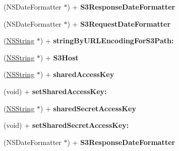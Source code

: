 \begin{DoxyCompactItemize}
\item 
\hypertarget{interface_a_s_i_s3_request_ac0d60115b59954ffcc2e293c60321a74}{
(\-N\-S\-Date\-Formatter $\ast$) + {\bfseries \-S3\-Response\-Date\-Formatter}}
\label{interface_a_s_i_s3_request_ac0d60115b59954ffcc2e293c60321a74}

\item 
\hypertarget{interface_a_s_i_s3_request_ac2da1def71701c5ed345a2e119dad803}{
(\-N\-S\-Date\-Formatter $\ast$) + {\bfseries \-S3\-Request\-Date\-Formatter}}
\label{interface_a_s_i_s3_request_ac2da1def71701c5ed345a2e119dad803}

\item 
\hypertarget{interface_a_s_i_s3_request_aab8bdd9f5d8970a3bcfca36ec9dee9fb}{
(\hyperlink{class_n_s_string}{\-N\-S\-String} $\ast$) + {\bfseries string\-By\-U\-R\-L\-Encoding\-For\-S3\-Path\-:}}
\label{interface_a_s_i_s3_request_aab8bdd9f5d8970a3bcfca36ec9dee9fb}

\item 
\hypertarget{interface_a_s_i_s3_request_ae49e83f64fb2490185d0a9ff3649e1d3}{
(\hyperlink{class_n_s_string}{\-N\-S\-String} $\ast$) + {\bfseries \-S3\-Host}}
\label{interface_a_s_i_s3_request_ae49e83f64fb2490185d0a9ff3649e1d3}

\item 
\hypertarget{interface_a_s_i_s3_request_aadbf1f29ab30efc3f4640bac7b508d32}{
(\hyperlink{class_n_s_string}{\-N\-S\-String} $\ast$) + {\bfseries shared\-Access\-Key}}
\label{interface_a_s_i_s3_request_aadbf1f29ab30efc3f4640bac7b508d32}

\item 
\hypertarget{interface_a_s_i_s3_request_ad944a2a1b20fc9e4559c8faf4f41b977}{
(void) + {\bfseries set\-Shared\-Access\-Key\-:}}
\label{interface_a_s_i_s3_request_ad944a2a1b20fc9e4559c8faf4f41b977}

\item 
\hypertarget{interface_a_s_i_s3_request_af1a72a1aacc05ce3f5def339d3bfbd5f}{
(\hyperlink{class_n_s_string}{\-N\-S\-String} $\ast$) + {\bfseries shared\-Secret\-Access\-Key}}
\label{interface_a_s_i_s3_request_af1a72a1aacc05ce3f5def339d3bfbd5f}

\item 
\hypertarget{interface_a_s_i_s3_request_aca8ba2305c0cbee1d7ec8553831768ff}{
(void) + {\bfseries set\-Shared\-Secret\-Access\-Key\-:}}
\label{interface_a_s_i_s3_request_aca8ba2305c0cbee1d7ec8553831768ff}

\item 
\hypertarget{interface_a_s_i_s3_request_ac0d60115b59954ffcc2e293c60321a74}{
(\-N\-S\-Date\-Formatter $\ast$) + {\bfseries \-S3\-Response\-Date\-Formatter}}
\label{interface_a_s_i_s3_request_ac0d60115b59954ffcc2e293c60321a74}


\end{DoxyCompactItemize}
